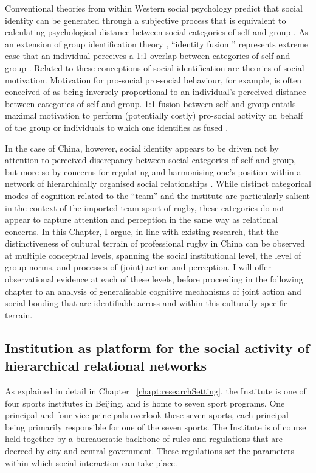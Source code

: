 \begin{CJK}{UTF8}{gbsn}
Conventional theories from within Western social psychology predict that social identity can be generated through a subjective process that is equivalent to calculating psychological distance between social categories of self and group \citep{Tajfel1971}.  As an extension of group identification theory \citep{Turner1987}, ``identity fusion '' represents extreme case that an individual perceives a 1:1 overlap between categories of self and group \citep{Swann2009}.  Related to these conceptions of social identification are theories of social motivation.  Motivation for pro-social pro-social behaviour, for example, is often conceived of as being inversely proportional to an individual's perceived distance between categories of self and group. 1:1 fusion between self and group entails maximal motivation to perform (potentially costly) pro-social activity on behalf of the group or individuals to which one identifies as fused \citep{Swann2015}.

In the case of China, however, social identity appears to be driven not by attention to perceived discrepancy between social categories of self and group, but more so by concerns for regulating and harmonising one's position within a network of hierarchically organised social relationships \citep{Liu2009}.  While distinct categorical modes of cognition related to the ``team'' and the institute are particularly salient in the context of the imported team sport of rugby, these categories do not appear to capture attention and perception in the same way as relational concerns.   In this Chapter, I argue, in line with existing research, that the distinctiveness of cultural terrain of professional rugby in China can be observed at multiple conceptual levels, spanning the social institutional level,  the level of group norms, and processes of (joint) action and perception.  I will offer observational evidence at each of these levels, before proceeding in the following chapter to an analysis of generalisable cognitive mechanisms of joint action and social bonding that are identifiable across and within this culturally specific terrain.


\subsection{Institution as platform for the social activity of hierarchical relational networks\label{sect:institutionPlatform}}

As explained in detail in Chapter ~\ref{chapt:researchSetting}, the Institute is one of four sports institutes in Beijing, and is home to seven sport programs.  One principal and four vice-principals overlook these seven sports, each principal being primarily responsible for one of the seven sports.  The Institute is of course held together by a bureaucratic backbone of rules and regulations that are decreed by city and central government.  These regulations set the parameters within which social interaction can take place.


\end{CJK}
